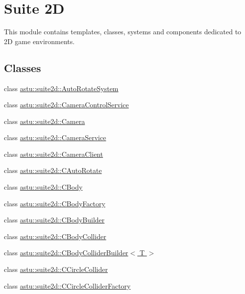 \hypertarget{group__suite2d__group}{}\section{Suite 2D}
\label{group__suite2d__group}


This module contains templates, classes, systems and components dedicated to 2D game environments.  


\subsection*{Classes}
\begin{DoxyCompactItemize}
\item 
class \hyperlink{classastu_1_1suite2d_1_1AutoRotateSystem}{astu\+::suite2d\+::\+Auto\+Rotate\+System}
\item 
class \hyperlink{classastu_1_1suite2d_1_1CameraControlService}{astu\+::suite2d\+::\+Camera\+Control\+Service}
\item 
class \hyperlink{classastu_1_1suite2d_1_1Camera}{astu\+::suite2d\+::\+Camera}
\item 
class \hyperlink{classastu_1_1suite2d_1_1CameraService}{astu\+::suite2d\+::\+Camera\+Service}
\item 
class \hyperlink{classastu_1_1suite2d_1_1CameraClient}{astu\+::suite2d\+::\+Camera\+Client}
\item 
class \hyperlink{classastu_1_1suite2d_1_1CAutoRotate}{astu\+::suite2d\+::\+C\+Auto\+Rotate}
\item 
class \hyperlink{classastu_1_1suite2d_1_1CBody}{astu\+::suite2d\+::\+C\+Body}
\item 
class \hyperlink{classastu_1_1suite2d_1_1CBodyFactory}{astu\+::suite2d\+::\+C\+Body\+Factory}
\item 
class \hyperlink{classastu_1_1suite2d_1_1CBodyBuilder}{astu\+::suite2d\+::\+C\+Body\+Builder}
\item 
class \hyperlink{classastu_1_1suite2d_1_1CBodyCollider}{astu\+::suite2d\+::\+C\+Body\+Collider}
\item 
class \hyperlink{classastu_1_1suite2d_1_1CBodyColliderBuilder}{astu\+::suite2d\+::\+C\+Body\+Collider\+Builder$<$ T $>$}
\item 
class \hyperlink{classastu_1_1suite2d_1_1CCircleCollider}{astu\+::suite2d\+::\+C\+Circle\+Collider}
\item 
class \hyperlink{classastu_1_1suite2d_1_1CCircleColliderFactory}{astu\+::suite2d\+::\+C\+Circle\+Collider\+Factory}
\item 

\end{DoxyCompactItemize}
